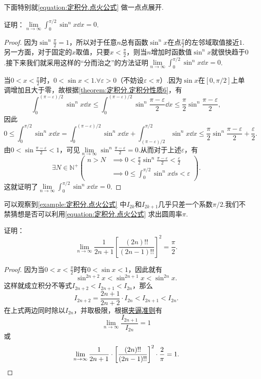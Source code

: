 下面特别就\cref{equation:定积分.点火公式} 做一点点展开.
\begin{example}
证明：\(\lim\limits_{n\to\infty} \int_0^{\pi/2} \sin^n x \dd{x} = 0\).
\begin{proof}
因为\(\sin^n\frac{\pi}{2}=1\)，所以对于任意\(n\)总有函数\(\sin^n x\)在点\(\frac{\pi}{2}\)的左邻域取值接近\(1\).另一方面，对于固定的\(x\)取值，只要\(x<\frac{\pi}{2}\)，则当\(n\)增加时函数值\(\sin^n x\)就很快趋于\(0\).接下来我们就采用这样的“分而治之”的方法证明\(\lim\limits_{n\to\infty} \int_0^{\pi/2} \sin^n x \dd{x} = 0\).

当\(0<x<\frac{\pi}{2}\)时，\(0<\sin x<1\).\(\forall\varepsilon>0\)（不妨设\(\varepsilon<\pi\)）.因为\(\sin x\)在\([0,\pi/2]\)上单调增加且大于零，故根据\cref{theorem:定积分.定积分性质6}，有\[
\int_0^{(\pi-\varepsilon)/2} \sin^n x \dd{x}
\leq
\int_0^{(\pi-\varepsilon)/2} \sin^n\frac{\pi-\varepsilon}{2} \dd{x}
\leq
\frac{\pi}{2} \sin^n\frac{\pi-\varepsilon}{2},
\]因此\[
0 \leq \int_0^{\pi/2} \sin^n x \dd{x}
= \int_0^{(\pi-\varepsilon)/2} \sin^n x \dd{x}
+ \int_{(\pi-\varepsilon)/2}^{\pi/2} \sin^n x \dd{x}
\leq \frac{\pi}{2} \sin^n\frac{\pi-\varepsilon}{2} + \frac{\varepsilon}{2}.
\]由\(0<\sin\frac{\pi-\varepsilon}{2}<1\)，可见\(\lim\limits_{n\to\infty} \sin^n\frac{\pi-\varepsilon}{2} = 0\).从而对于上述\(\varepsilon\)，有\[
\exists N\in\mathbb{N}^+ \left( \begin{array}{ll}
n>N &\implies 0<\frac{\pi}{2} \sin^n\frac{\pi-\varepsilon}{2}<\frac{\varepsilon}{2} \\
&\implies 0 \leq \int_0^{\pi/2} \sin^n x \dd{s} < \varepsilon
\end{array} \right).
\]这就证明了\(\lim\limits_{n\to\infty} \int_0^{\pi/2} \sin^n x \dd{x} = 0\).
\end{proof}
\end{example}

可以观察到\cref{example:定积分.点火公式} 中\(I_{2k}\)和\(I_{2k+1}\)几乎只差一个系数\(\pi/2\).我们不禁猜想是否可以利用\cref{equation:定积分.点火公式} 求出圆周率\(\pi\).
\begin{example}[Wallis公式]
证明：\begin{equation}\label{equation:定积分.Wallis公式}
\lim\limits_{n\to\infty} \frac{1}{2n+1} \left[
\frac{(2n)!!}{(2n-1)!!}
\right]^2 = \frac{\pi}{2}.
\end{equation}
\begin{proof}
因为当\(0<x<\frac{\pi}{2}\)时有\(0<\sin x<1\)，因此就有\[
\sin^{2n+2} x < \sin^{2n+1} x < \sin^{2n} x.
\]这样就成立积分不等式\(I_{2n+2} < I_{2n+1} < I_{2n}\)，那么\[
I_{2n+2} = \frac{2n+1}{2n+2} \cdot I_{2n}
< I_{2n+1} < I_{2n}.
\]在上式两边同时除以\(I_{2n}\)，并取极限，根据\hyperref[theorem:极限.夹逼准则]{夹逼准则}有\[
\lim\limits_{n\to\infty} \frac{I_{2n+1}}{I_{2n}} = 1
\]或\[
\lim\limits_{n\to\infty} \frac{1}{2n+1} \cdot \left[
	\frac{(2n)!!}{(2n-1)!!}
\right]^2 \cdot \frac{2}{\pi} = 1.
\qedhere
\]
\end{proof}
\end{example}

